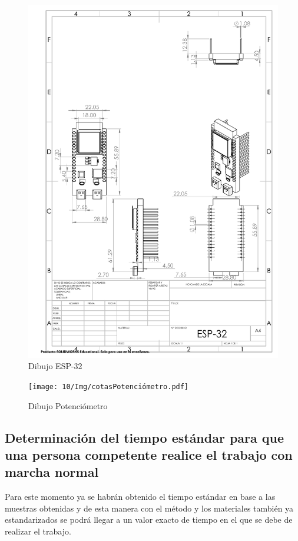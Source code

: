 \begin{figure}[H]
    \centering
    \includegraphics[scale=0.4]{10/Img/cotasEsp-32.pdf}
    \caption{Dibujo ESP-32}
    \label{fig:cotasEsp-32.png}
\end{figure}

\begin{figure}[H]
    \centering
    \texttt{[image: 10/Img/cotasPotenciómetro.pdf]}
    \caption{Dibujo Potenciómetro}
    \label{fig:cotasPotenciómetro.png}
\end{figure}
%
%
\subsection{Determinación del tiempo estándar para que una persona competente realice el trabajo con marcha normal}

Para este momento ya se habrán obtenido el tiempo estándar en base a las muestras obtenidas y de esta manera con el método y los materiales también ya estandarizados se podrá llegar a un valor exacto de tiempo en el que se debe de realizar el trabajo.
%
%


